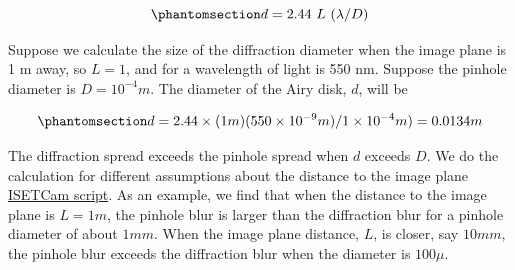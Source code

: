 \documentclass[
  letterpaper,
]{book}
\begin{document}
\begin{equation}\phantomsection\label{eq-airy1}{
d = 2.44~L~(\lambda / D)
}\end{equation}

Suppose we calculate the size of the diffraction diameter when the image
plane is 1 m away, so \(L=1\), and for a wavelength of light is 550 nm.
Suppose the pinhole diameter is \(D = 10^{-4} m\). The diameter of the
Airy disk, \(d\), will be

\begin{equation}\phantomsection\label{eq-airydisk1}{
d = 2.44 \times (1 m) (550 \times 10^{-9} m )/ 1 \times 10^{-4}m) = 0.0134 m
}\end{equation}

The diffraction spread exceeds the pinhole spread when \(d\) exceeds
\(D\). We do the calculation for different assumptions about the
distance to the image plane \href{./code/fise_diffraction.html}{ISETCam
script}. As an example, we find that when the distance to the image
plane is \(L = 1m\), the pinhole blur is larger than the diffraction
blur for a pinhole diameter of about \(1 mm\). When the image plane
distance, \(L\), is closer, say \(10 mm\), the pinhole blur exceeds the
diffraction blur when the diameter is \(100 \mu\).
\end{document}
